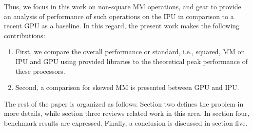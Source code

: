 \documentclass[a4paper,UKenglish,cleveref, autoref, thm-restate]{oasics-v2021}
\begin{document}
Thus, we focus in this work on non-square MM operations, and gear to provide an analysis of performance of such operations on the IPU in comparison to a recent GPU as a baseline. In this regard, the present work makes the following contributions:

\begin{enumerate}
\item First, we compare the overall performance or standard, i.e., squared, MM on IPU and GPU using provided libraries to the theoretical peak performance of these processors. 
\item Second, a comparison for skewed MM is presented between GPU and IPU. 
\end{enumerate}

The rest of the paper is organized as follows: Section two defines the problem in more details, while section three reviews related work in this area. In section four, benchmark results are expressed. Finally, a conclusion is discussed in section five.


\end{document}
